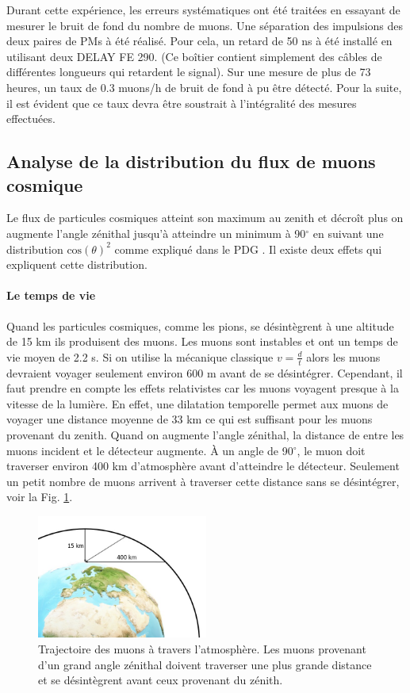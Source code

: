 \documentclass[12pt]{article}
\begin{document}
Durant cette expérience, les erreurs systématiques ont été traitées en essayant de mesurer le bruit de fond du nombre de muons. 
Une séparation des impulsions des deux paires de PMs à été réalisé. Pour cela, un retard de 50 ns  à été installé en utilisant deux DELAY FE 290. (Ce boîtier contient simplement des câbles de différentes longueurs qui retardent le signal). Sur une mesure de plus de 73 heures, un taux de 0.3 muons/h de bruit de fond à pu être détecté. Pour la suite, il est évident que ce taux devra être soustrait à l'intégralité des mesures effectuées.

\subsection{Analyse de la distribution du flux de muons cosmique}

Le flux de particules cosmiques atteint son maximum au zenith et décroît plus on augmente l'angle zénithal jusqu'à atteindre un minimum à 90$^\circ$ en suivant une distribution $\text{cos}(\theta)^2$ comme expliqué dans le PDG \cite{PhysRevD.98.030001}. Il existe deux effets qui expliquent cette distribution.

\paragraph{Le temps de vie}
Quand les particules cosmiques, comme les pions, se désintègrent à une altitude de 15 km ils produisent des muons. Les muons sont instables et ont un temps de vie moyen de 2.2 \SIUnitSymbolMicro s. Si on utilise la mécanique classique $v=\frac{d}{t}$ alors les muons devraient voyager seulement environ 600 m avant de se désintégrer. Cependant, il faut prendre en compte les effets relativistes car les muons voyagent presque à la vitesse de la lumière. En effet, une dilatation temporelle permet aux muons de voyager une distance moyenne de 33 km ce qui est suffisant pour les muons provenant du zenith. Quand on augmente l'angle zénithal, la distance de entre les muons incident et le détecteur augmente. À un angle de 90$^\circ$, le muon doit traverser environ 400 km d'atmosphère avant d'atteindre le détecteur. Seulement un petit nombre de muons arrivent à traverser cette distance sans se désintégrer, voir la Fig. \ref{fig:PathMuonAtmosphere}.
\begin{figure}[!htbp]
    \centering
    \includegraphics[width=0.5\textwidth]{Images/Schemas/PathOfMuonThroughAtmosphere.jpg}
    \caption{Trajectoire des muons à travers l'atmosphère. Les muons provenant d'un grand angle zénithal doivent traverser une plus grande distance et se désintègrent avant ceux provenant du zénith.}
    \label{fig:PathMuonAtmosphere}
\end{figure}
\end{document}
